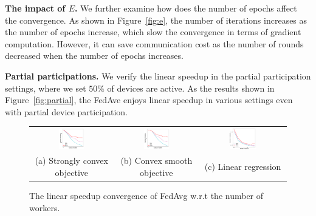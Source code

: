 \textbf{The impact of $E$.} We further examine how does the number of epochs 
affect the convergence. As shown in Figure~\ref{fig:e}, the number of iterations
increases as the number of epochs increase, which slow the convergence in
terms of gradient computation. However, it can save communication cost as
the number of rounds decreased when the number of epochs increases.


\textbf{Partial participations.} We verify the linear speedup in the
partial participation settings, where we set $50\%$ of devices
are active. As the results shown in Figure~\ref{fig:partial}, the 
FedAve enjoys linear speedup in various settings even with partial
device participation.



\begin{figure}
\centering
	\begin{tabular}{ccc}
	\hspace{-2em}\includegraphics[width=0.33\textwidth]{fig/paper-stronglycvxsmthspeedupNodesT-min-w8a-epsilon0131-reg1e-05.pdf} &
\includegraphics[width=0.33\textwidth]{fig/paper-cvxsmoothspeedupNodesT-min-w8a-epsilon0134-reg0.pdf} &
\includegraphics[width=0.33\textwidth]{fig/paper-linregressionspeedupNodesT-min-linearregressionw8a-epsilon002-reg0.pdf}\\
(a) Strongly convex objective & (b) Convex smooth objective & (c) Linear regression
	\end{tabular}
\caption{The linear speedup convergence of FedAvg w.r.t the number of workers. }
\label{fig:speedup}
\end{figure}

